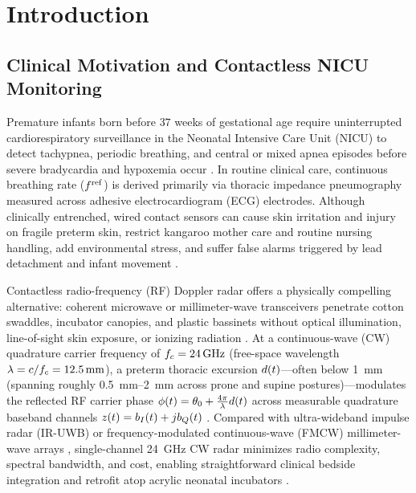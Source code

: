\chapter{Introduction}
\label{ch:introduction}

\section{Clinical Motivation and Contactless NICU Monitoring}
\label{sec:ch1_motivation}

Premature infants born before $37$ weeks of gestational age require uninterrupted cardiorespiratory
surveillance in the Neonatal Intensive Care Unit (NICU) to detect tachypnea, periodic breathing,
and central or mixed apnea episodes before severe bradycardia and hypoxemia occur
\citep{beltrao2022contactless,krbec2024emerging,senechal2026next}. In routine clinical care,
continuous breathing rate ($f^{\mathrm{ref}}$) is derived primarily via thoracic impedance pneumography
measured across adhesive electrocardiogram (ECG) electrodes. Although clinically entrenched, wired
contact sensors can cause skin irritation and injury on fragile preterm skin, restrict kangaroo
mother care and routine nursing handling, add environmental stress, and suffer false alarms
triggered by lead detachment and infant movement
\citep{beltrao2022contactless,krbec2024emerging,lee2020feasibility}.

Contactless radio-frequency (RF) Doppler radar offers a physically compelling alternative: coherent
microwave or millimeter-wave transceivers penetrate cotton swaddles, incubator canopies, and plastic
bassinets without optical illumination, line-of-sight skin exposure, or ionizing radiation
\citep{droitcour2004range,li2013review,kim2019noncontact,liao2025noncontact,hari2025contactless}.
At a continuous-wave (CW) quadrature carrier frequency of $f_c = \SI{24}{\giga\hertz}$
(free-space wavelength $\lambda = c/f_c = \SI{12.5}{\milli\meter}$), a
preterm thoracic excursion $d(t)$---often below \SI{1}{\milli\meter} (spanning roughly
\SIrange{0.5}{2}{\milli\meter} across prone and supine postures)---modulates the
reflected RF carrier phase $\phi(t) = \theta_0 + \frac{4\pi}{\lambda}d(t)$ across
measurable quadrature baseband channels $z(t) = b_I(t) + jb_Q(t)$
\citep{li2008random,morgan2009novel,beltrao2022contactless,gleichauf2021automated}. Compared with
ultra-wideband impulse radar (IR-UWB) \citep{kim2019noncontact,lee2020feasibility,wang2020experimental}
or frequency-modulated continuous-wave (FMCW) millimeter-wave arrays \citep{liao2025noncontact},
single-channel \SI{24}{\giga\hertz} CW radar minimizes radio complexity, spectral bandwidth, and
cost, enabling straightforward clinical bedside integration \citep{schellenberger2020dataset} and
retrofit atop acrylic neonatal incubators \citep{beltrao2022contactless,gleichauf2021automated}.

